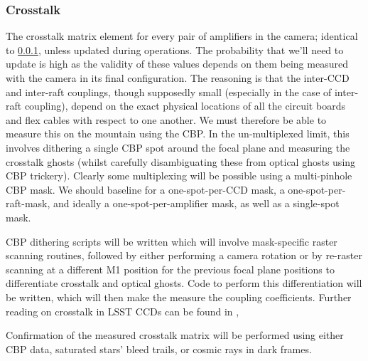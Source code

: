 \subsubsection{Crosstalk}\label{sec:CPP:output:crosstalk}
The crosstalk matrix element for every pair of amplifiers in the camera; identical to \secsymbol\ref{sec:CPP:output:crosstalk}, unless updated during operations. The probability that we'll need to update is high as the validity of these values depends on them being measured with the camera in its final configuration. The reasoning is that the inter-CCD and inter-raft couplings, though supposedly small (especially in the case of inter-raft coupling), depend on the exact physical locations of all the circuit boards and flex cables with respect to one another. We must therefore be able to measure this on the mountain using the CBP.
\alg In the un-multiplexed limit, this involves dithering a single CBP spot around the focal plane and measuring the crosstalk ghosts (whilst carefully disambiguating these from optical ghosts using CBP trickery). Clearly some multiplexing will be possible using a multi-pinhole CBP mask. We should baseline for a one-spot-per-CCD mask, a one-spot-per-raft-mask, and ideally a one-spot-per-amplifier mask, as well as a single-spot mask.

CBP dithering scripts will be written which will involve mask-specific raster scanning routines, followed by either performing a camera rotation or by re-raster scanning at a different M1 position for the previous focal plane positions to differentiate crosstalk and optical ghosts. Code to perform this differentiation will be written, which will then make the measure the coupling coefficients. Further reading on crosstalk in LSST CCDs can be found in \cite{OConnor15},

Confirmation of the measured crosstalk matrix will be performed using either CBP data, saturated stars' bleed trails, or cosmic rays in dark frames.



